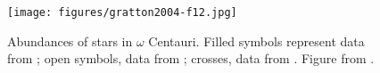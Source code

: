 \documentclass[]{article}
\begin{document}
\begin{figure}
 \begin{center}\texttt{[image: figures/gratton2004-f12.jpg]}\end{center}
 \caption{Abundances of stars in $\omega$ Centauri. Filled symbols represent data from \citet{Norris:1995kc}; open symbols, data from \citet{Smith:2000cb}; crosses, data from \citet{Pancino:2002eq}. Figure from \citet{Gratton:2004dy}.}\label{fig:gratton2004-f12}
\end{figure}
\end{document}
